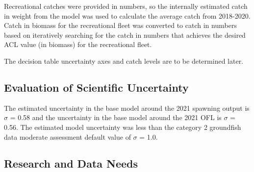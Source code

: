 \documentclass[11pt,
  english,
  a4paper,
]{article}
\begin{document}
\leavevmode\tagmcend\tagstructend\par


Recreational catches were provided in numbers, so the internally estimated catch in weight from the model was used to calculate the average catch from 2018-2020. Catch in biomass for the recreational fleet was converted to catch in numbers based on iteratively searching for the catch in numbers that achieves the desired ACL value (in biomass) for the recreational fleet.

\leavevmode\tagmcend\tagstructend\par


The decision table uncertainty axes and catch levels are to be determined later.

\leavevmode\tagmcend\tagstructend\par


\hypertarget{evaluation-of-scientific-uncertainty}{%
\subsection{Evaluation of Scientific Uncertainty}\label{evaluation-of-scientific-uncertainty}}

\leavevmode\tagmcend\tagstructend


The estimated uncertainty in the base model around the 2021 spawning output is {\(\sigma\)\leavevmode\tagmcend\tagstructend} = 0.58 and the uncertainty in the base model around the 2021 OFL is {\(\sigma\)\leavevmode\tagmcend\tagstructend} = 0.56. The estimated model uncertainty was less than the category 2 groundfish data moderate assessment default value of {\(\sigma\)\leavevmode\tagmcend\tagstructend} = 1.0.

\leavevmode\tagmcend\tagstructend\par


\hypertarget{research-and-data-needs}{%
\subsection{Research and Data Needs}\label{research-and-data-needs}}
\end{document}
